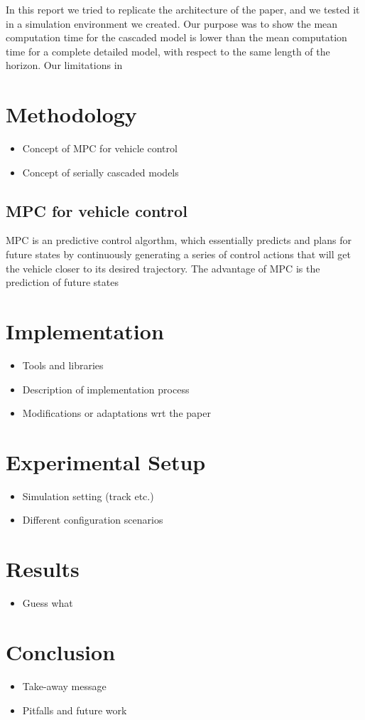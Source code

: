 \documentclass[a4paper, twocolumn, 11pt, twoside]{article}
\begin{document}
In this report we tried to replicate the architecture of the paper, and we tested it in a simulation environment we created.
Our purpose was to show the mean computation time for the cascaded model is lower than the mean computation time for a complete
detailed model, with respect to the same length of the horizon. Our limitations in 


\section{Methodology}

\begin{itemize}
    \item Concept of MPC for vehicle control
    \item Concept of serially cascaded models
\end{itemize}

\subsection*{MPC for vehicle control}
MPC is an predictive control algorthm, which essentially predicts and plans for future states by continuously generating a series 
of control actions that will get the vehicle closer to its desired trajectory. The advantage of MPC is the prediction of future states

\section{Implementation}

\begin{itemize}
    \item Tools and libraries
    \item Description of implementation process
    \item Modifications or adaptations wrt the paper
\end{itemize}

\section{Experimental Setup}

\begin{itemize}
    \item Simulation setting (track etc.)
    \item Different configuration scenarios
\end{itemize}

\section{Results}

\begin{itemize}
    \item Guess what
\end{itemize}

\section{Conclusion}

\begin{itemize}
    \item Take-away message
    \item Pitfalls and future work
\end{itemize}



\end{document}
